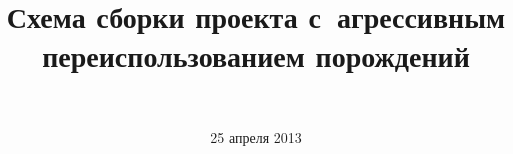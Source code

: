 \title{Схема сборки проекта с~агрессивным переиспользованием порождений}

\author[Сергей Серебряков]{
	\\
}

\date{25 апреля 2013}
